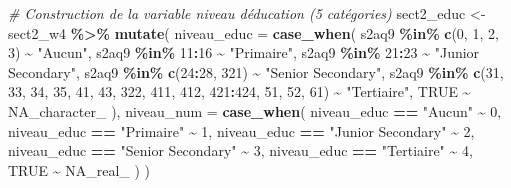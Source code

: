 \documentclass[
  11pt,
]{article}
\newenvironment{Shaded}{\begin{snugshade}}{\end{snugshade}}
\newcommand{\AttributeTok}[1]{\textcolor[rgb]{0.13,0.29,0.53}{#1}}
\newcommand{\CommentTok}[1]{\textcolor[rgb]{0.56,0.35,0.01}{\textit{#1}}}
\newcommand{\ConstantTok}[1]{\textcolor[rgb]{0.56,0.35,0.01}{#1}}
\newcommand{\DecValTok}[1]{\textcolor[rgb]{0.00,0.00,0.81}{#1}}
\newcommand{\FunctionTok}[1]{\textcolor[rgb]{0.13,0.29,0.53}{\textbf{#1}}}
\newcommand{\NormalTok}[1]{#1}
\newcommand{\OtherTok}[1]{\textcolor[rgb]{0.56,0.35,0.01}{#1}}
\newcommand{\SpecialCharTok}[1]{\textcolor[rgb]{0.81,0.36,0.00}{\textbf{#1}}}
\newcommand{\StringTok}[1]{\textcolor[rgb]{0.31,0.60,0.02}{#1}}
\begin{document}
\begin{Shaded}
\begin{Highlighting}[]
\CommentTok{\# Construction de la variable niveau d\textquotesingle{}éducation (5 catégories)}
\NormalTok{sect2\_educ }\OtherTok{\textless{}{-}}\NormalTok{ sect2\_w4 }\SpecialCharTok{\%\textgreater{}\%}
  \FunctionTok{mutate}\NormalTok{(}
    \AttributeTok{niveau\_educ =} \FunctionTok{case\_when}\NormalTok{(}
\NormalTok{      s2aq9 }\SpecialCharTok{\%in\%} \FunctionTok{c}\NormalTok{(}\DecValTok{0}\NormalTok{, }\DecValTok{1}\NormalTok{, }\DecValTok{2}\NormalTok{, }\DecValTok{3}\NormalTok{)       }\SpecialCharTok{\textasciitilde{}} \StringTok{"Aucun"}\NormalTok{,}
\NormalTok{      s2aq9 }\SpecialCharTok{\%in\%} \DecValTok{11}\SpecialCharTok{:}\DecValTok{16}               \SpecialCharTok{\textasciitilde{}} \StringTok{"Primaire"}\NormalTok{,}
\NormalTok{      s2aq9 }\SpecialCharTok{\%in\%} \DecValTok{21}\SpecialCharTok{:}\DecValTok{23}               \SpecialCharTok{\textasciitilde{}} \StringTok{"Junior Secondary"}\NormalTok{,}
\NormalTok{      s2aq9 }\SpecialCharTok{\%in\%} \FunctionTok{c}\NormalTok{(}\DecValTok{24}\SpecialCharTok{:}\DecValTok{28}\NormalTok{, }\DecValTok{321}\NormalTok{)       }\SpecialCharTok{\textasciitilde{}} \StringTok{"Senior Secondary"}\NormalTok{,}
\NormalTok{      s2aq9 }\SpecialCharTok{\%in\%} \FunctionTok{c}\NormalTok{(}\DecValTok{31}\NormalTok{, }\DecValTok{33}\NormalTok{, }\DecValTok{34}\NormalTok{, }\DecValTok{35}\NormalTok{,}
                   \DecValTok{41}\NormalTok{, }\DecValTok{43}\NormalTok{, }\DecValTok{322}\NormalTok{, }\DecValTok{411}\NormalTok{,}
                   \DecValTok{412}\NormalTok{, }\DecValTok{421}\SpecialCharTok{:}\DecValTok{424}\NormalTok{,}
                   \DecValTok{51}\NormalTok{, }\DecValTok{52}\NormalTok{, }\DecValTok{61}\NormalTok{)       }\SpecialCharTok{\textasciitilde{}} \StringTok{"Tertiaire"}\NormalTok{,}
      \ConstantTok{TRUE}                           \SpecialCharTok{\textasciitilde{}} \ConstantTok{NA\_character\_}
\NormalTok{    ),}
    \AttributeTok{niveau\_num =} \FunctionTok{case\_when}\NormalTok{(}
\NormalTok{      niveau\_educ }\SpecialCharTok{==} \StringTok{"Aucun"}             \SpecialCharTok{\textasciitilde{}} \DecValTok{0}\NormalTok{,}
\NormalTok{      niveau\_educ }\SpecialCharTok{==} \StringTok{"Primaire"}          \SpecialCharTok{\textasciitilde{}} \DecValTok{1}\NormalTok{,}
\NormalTok{      niveau\_educ }\SpecialCharTok{==} \StringTok{"Junior Secondary"}  \SpecialCharTok{\textasciitilde{}} \DecValTok{2}\NormalTok{,}
\NormalTok{      niveau\_educ }\SpecialCharTok{==} \StringTok{"Senior Secondary"}  \SpecialCharTok{\textasciitilde{}} \DecValTok{3}\NormalTok{,}
\NormalTok{      niveau\_educ }\SpecialCharTok{==} \StringTok{"Tertiaire"}         \SpecialCharTok{\textasciitilde{}} \DecValTok{4}\NormalTok{,}
      \ConstantTok{TRUE}                               \SpecialCharTok{\textasciitilde{}} \ConstantTok{NA\_real\_}
\NormalTok{    )}
\NormalTok{  )}


\end{Highlighting}
\end{Shaded}
\end{document}
